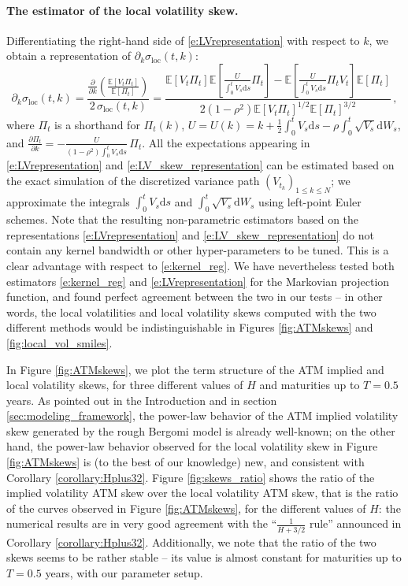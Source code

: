 \documentclass[11pt]{article}
\theoremstyle{plain}
\theoremstyle{definition}
\theoremstyle{remark}
\newcommand{\be}{\beta}
\newcommand{\dd}{\mathrm{d}}
\newcommand{\bE}{\mathbb{E}}
\newcommand{\1}{\mathbf{1}}
\numberwithin{equation}{section}
\def\be{\begin{equation}}
\def\ee{\end{equation}}
\def\sigDup{\sigma_\mathrm{loc}}
\begin{document}
\paragraph{The estimator of the local volatility skew.}
Differentiating the right-hand side of \eqref{e:LVrepresentation} with respect to $k$, we obtain a representation of $\partial_k \sigDup(t, k)$:
\be \label{e:LV_skew_representation} 
\partial_{k}\sigDup(t,k)
=
\frac{\frac{\partial}{\partial k} \left(\frac{\bE\left[V_{t}\Pi_{t}\right]}{\bE\left[\Pi_{t}\right]}\right)}{2 \, \sigDup(t,k)} 
= \frac{\bE\left[V_{t}\Pi_{t}\right]\bE\left[\frac{U}{\int_{0}^{t} V_{s}\dd s}\Pi_{t}\right]
	- \bE\left[\frac{U}{\int_{0}^{t}V_{s}\dd s}\Pi_{t}V_{t}\right]\bE\left[\Pi_{t}\right]}{2(1-\rho^{2})\bE\left[V_{t}\Pi_{t}\right]^{1/2}\bE\left[\Pi_{t}\right]^{3/2}} \,,
\ee
where $\Pi_{t}$ is a shorthand for $\Pi_{t}(k)$, 
$U = U(k) = k + \frac{1}{2}\int_{0}^{t}V_{s}\dd s - \rho\int_{0}^{t}\sqrt{V_{s}}\dd W_{s}$,
and  $\frac{\partial\Pi_{t}}{\partial k} = -\frac{U}{(1-\rho^{2})\int_{0}^{t}V_{s}\dd s} \,\Pi_{t}$.
All the expectations  appearing in \eqref{e:LVrepresentation} and \eqref{e:LV_skew_representation} can be estimated based on  the exact simulation of the discretized variance path $(V_{t_k})_{1 \le k \le N}$; we approximate the integrals $\int_0^t V_s \dd s$ and $\int_0^t \sqrt{V_s} \dd W_s$ using left-point Euler schemes.
Note that the resulting non-parametric estimators based on the representations \eqref{e:LVrepresentation} and \eqref{e:LV_skew_representation} do not contain any kernel bandwidth or other 
hyper-parameters to be tuned. This is a clear advantage with respect to \eqref{e:kernel_reg}.
We have nevertheless tested both estimators \eqref{e:kernel_reg} and \eqref{e:LVrepresentation} for the Markovian projection function, and found perfect agreement between the two in our tests -- in other words, the local volatilities and local volatility skews computed with the two different methods would be indistinguishable in Figures \ref{fig:ATMskews} and \ref{fig:local_vol_smiles}.
\medskip

In Figure \ref{fig:ATMskews}, we plot the term structure of the ATM implied and local volatility skews, for three different values of $H$ and maturities up to $T=0.5$ years. 
As pointed out in the Introduction and in section \ref{sec:modeling_framework}, the power-law behavior of the ATM implied volatility skew generated by the rough Bergomi model is already well-known; on the other hand, the power-law behavior observed for the local volatility skew in Figure \ref{fig:ATMskews} is (to the best of our knowledge) new, and consistent with Corollary \ref{corollary:Hplus32}.
Figure \ref{fig:skews_ratio} shows the ratio of the implied volatility ATM skew over the local volatility ATM skew, that is the ratio of the curves observed in Figure \ref{fig:ATMskews}, for the different values of $H$: the numerical results are in very good agreement with the ``$\frac{1}{H+3/2}$ rule'' announced in Corollary \ref{corollary:Hplus32}. 
Additionally, we note that the ratio of the two skews seems to be rather stable -- its value is almost constant for maturities up to $T=0.5$ years, with our parameter setup.
\end{document}
